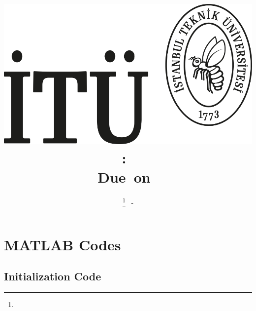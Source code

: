 \documentclass[12pt]{article}
\title{
	\includegraphics[width=0.5\linewidth]{./fig/itu_logo}\\	
	\vspace{.5in}
	\textmd{\textbf{\hmwkClass:\ \hmwkTitle}}\\
	\normalsize\vspace{0.1in}\small{Due\ on\ \hmwkDueDate}\\
	\vspace{0.1in}\large{\textit{\hmwkClassInstructor}}
	\vspace{1in}
}
\author{
	\textbf{\hmwkAuthorNameI}\thanks{\hmwkAuthorEmailI} \ - \textbf{\hmwkAuthorIDI} \\
	}
\date{} %
\begin{document}
\maketitle



\newpage
\thispagestyle{empty} %
\tableofcontents
\newpage
{}













\newpage




\newpage
\appendix

\section{MATLAB Codes}

\subsection{Initialization Code} \label{App_Int}


\end{document}
